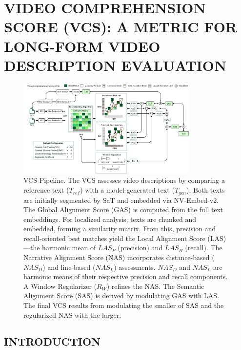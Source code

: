 \documentclass[main.tex]{subfiles}
\begin{document}
\section{VIDEO COMPREHENSION SCORE (VCS): A METRIC FOR LONG-FORM VIDEO DESCRIPTION EVALUATION}

\begin{figure}[t]
\centering
\includegraphics[width=0.8\textwidth]{images/VCS.pdf}
\caption{VCS Pipeline. The VCS assesses video descriptions by comparing a reference text ($T_{ref}$) with a model-generated text ($T_{gen}$). Both texts are initially segmented by SaT and embedded via NV-Embed-v2. The Global Alignment Score (GAS) is computed from the full text embeddings. For localized analysis, texts are chunked and embedded, forming a similarity matrix. From this, precision and recall-oriented best matches yield the Local Alignment Score (LAS)—the harmonic mean of $LAS_P$ (precision) and $LAS_R$ (recall). The Narrative Alignment Score (NAS) incorporates distance-based ($NAS_D$) and line-based ($NAS_L$) assessments. $NAS_D$ and $NAS_L$ are harmonic means of their respective precision and recall components. A Window Regularizer ($R_W$) refines the NAS. The Semantic Alignment Score (SAS) is derived by modulating GAS with LAS. The final VCS results from modulating the smaller of SAS and the regularized NAS with the larger.}
\label{fig:vcs-architecture}
\end{figure}

\subsection{INTRODUCTION}
\end{document}
